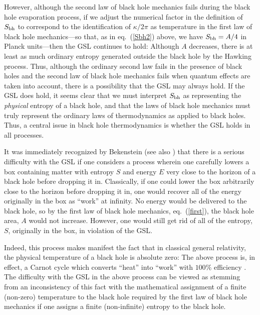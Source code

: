 However, although the second law of black hole mechanics fails during
the black hole evaporation process, if we adjust the numerical factor
in the definition of $S_{\rm bh}$ to correspond to the identification
of $\kappa/2\pi$ as temperature in the first law of black hole
mechanics---so that, as in eq.~(\ref{Sbh2}) above, we have $S_{\rm bh}
= A/4$ in Planck units---then the GSL continues to hold: Although $A$
decreases, there is at least as much ordinary entropy generated
outside the black hole by the Hawking process. Thus, although the
ordinary second law fails in the presence of black holes and the
second law of black hole mechanics fails when quantum effects are
taken into account, there is a possibility that the GSL may always
hold. If the GSL does hold, it seems clear that we must interpret
$S_{\rm bh}$ as representing the {\it physical} entropy of a black
hole, and that the laws of black hole mechanics must truly represent
the ordinary laws of thermodynamics as applied to black holes. Thus, a
central issue in black hole thermodynamics is whether the GSL holds in
all processes.

It was immediately recognized by Bekenstein \cite{b1} (see also
\cite{bch}) that there is a serious difficulty with the GSL if one
considers a process wherein one carefully lowers a box containing
matter with entropy $S$ and energy $E$ very close to the horizon of a
black hole before dropping it in. Classically, if one could lower the
box arbitrarily close to the horizon before dropping it in, one would
recover all of the energy originally in the box as ``work'' at
infinity. No energy would be delivered to the black hole, so by the
first law of black hole mechanics, eq.~(\ref{first}), the black hole
area, $A$ would not increase. However, one would still get rid of all
of the entropy, $S$, originally in the box, in violation of the
GSL. 

Indeed, this process makes manifest the fact that in classical general
relativity, the physical temperature of a black hole is absolute zero:
The above process is, in effect, a Carnot cycle which converts
``heat'' into ``work'' with $100\%$ efficiency \cite{g}. The
difficulty with the GSL in the above process can be viewed as stemming
from an inconsistency of this fact with the mathematical assignment of
a finite (non-zero) temperature to the black hole required by the
first law of black hole mechanics if one assigns a finite
(non-infinite) entropy to the black hole.

